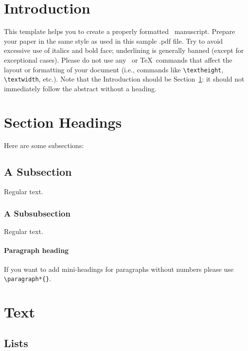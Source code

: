 \documentclass[rbe,fleqn]{econbr}
\begin{document}

\section{Introduction}\label{s1}

This template helps you to create a properly formatted \LaTeXe\ manuscript. Prepare your paper in the same style as used in this sample .pdf file. Try to avoid excessive use of italics and bold face; underlining is generally banned (except for exceptional cases). Please do not use any \LaTeXe\ or \TeX\ commands that affect the layout or formatting of your document (i.e., commands like \verb|\textheight|, \verb|\textwidth|, etc.). Note that the Introduction should be Section~\ref{s1}: it should not immediately follow the abstract without a heading.

\section{Section Headings}
Here are some subsections:
\subsection{A Subsection}
Regular text.
\subsubsection{A Subsubsection}
Regular text.

\paragraph*{Paragraph heading} If you want to add mini-headings for paragraphs without numbers please use \verb|\paragraph*{}|.

\section{Text}

\subsection{Lists}
\end{document}
